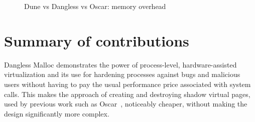 \begin{figure}
    \centering
    \caption{Dune vs Dangless vs Oscar: memory overhead}
\end{figure}

\section{Summary of contributions}

Dangless Malloc demonstrates the power of process-level, hardware-assisted virtualization and its use for hardening processes against bugs and malicious users without having to pay the usual performance price associated with system calls. This makes the approach of creating and destroying shadow virtual pages, used by previous work such as Oscar~\cite{oscar2017}, noticeably cheaper, without making the design significantly more complex.

